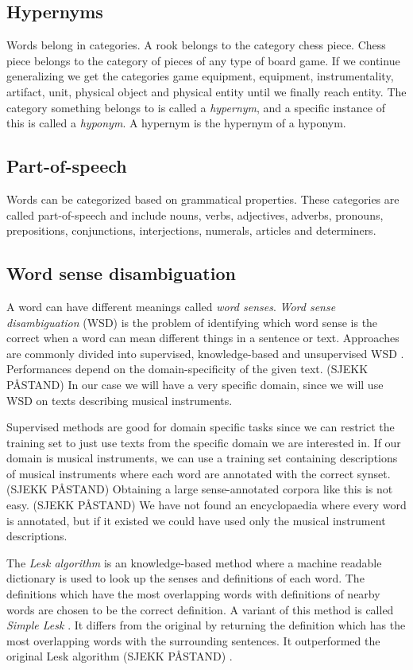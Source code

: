 \subsection{Hypernyms}
Words belong in categories. A rook belongs to the category chess piece. Chess piece belongs to the category of pieces of any type of board game. If we continue generalizing we get the categories game equipment, equipment, instrumentality, artifact, unit, physical object and physical entity until we finally reach entity. The category something belongs to is called a \emph{hypernym}, and a specific instance of this is called a \emph{hyponym}. A hypernym is the hypernym of a hyponym.

\subsection{Part-of-speech}
Words can be categorized based on grammatical properties. These categories are called part-of-speech and include nouns, verbs, adjectives, adverbs, pronouns, prepositions, conjunctions, interjections, numerals, articles and determiners.

\subsection{Word sense disambiguation}
A word can have different meanings called \emph{word senses}. \emph{Word sense disambiguation} (WSD) is the problem of identifying which word sense is the correct when a word can mean different things in a sentence or text. Approaches are commonly divided into supervised, knowledge-based and unsupervised WSD \parencite{moro2014entity}. Performances depend on the domain-specificity of the given text. (SJEKK PÅSTAND) In our case we will have a very specific domain, since we will use WSD on texts describing musical instruments.

Supervised methods are good for domain specific tasks since we can restrict the training set to just use texts from the specific domain we are interested in. If our domain is musical instruments, we can use a training set containing descriptions of musical instruments where each word are annotated with the correct synset. (SJEKK PÅSTAND) Obtaining a large sense-annotated corpora like this is not easy. (SJEKK PÅSTAND) We have not found an encyclopaedia where every word is annotated, but if it existed we could have used only the musical instrument descriptions.

The \emph{Lesk algorithm} is an knowledge-based method where a machine readable dictionary is used to look up the senses and definitions of each word. The definitions which have the most overlapping words with definitions of nearby words are chosen to be the correct definition. \parencite{lesk1986automatic} A variant of this method is called \emph{Simple Lesk} \parencite{kilgarriff2000english}. It differs from the original by returning the definition which has the most overlapping words with the surrounding sentences. It outperformed the original Lesk algorithm (SJEKK PÅSTAND) \parencite{vasilescu2004evaluating}.

